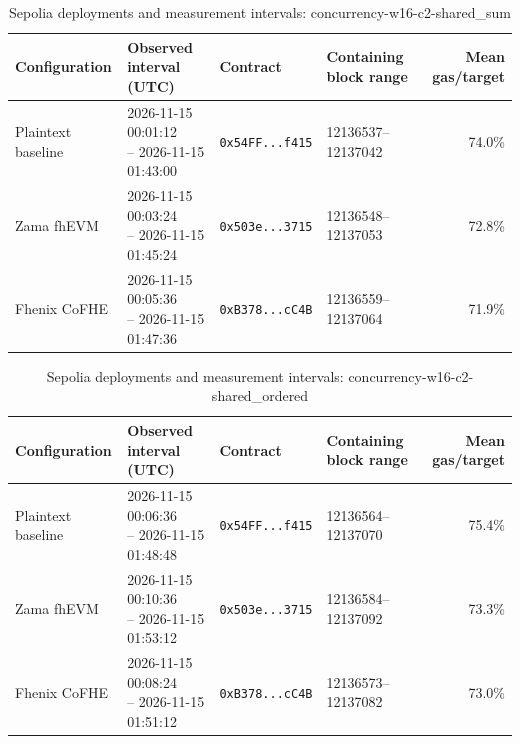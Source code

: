 \begin{table}[!t]
\caption{Sepolia deployments and measurement intervals: concurrency-w16-c2-shared\_sum}
\label{tab:sepolia-concurrency-w16-c2-shared-sum}
\centering
\footnotesize
\setlength{\tabcolsep}{4pt}
\begin{tabular}{|l|l|l|l|r|}
\hline
\textbf{Configuration} & \textbf{Observed interval (UTC)} & \textbf{Contract} & \textbf{Containing block range} & \textbf{Mean gas/target} \\
\hline
Plaintext baseline & \shortstack[l]{2026-11-15 00:01:12 \\ -- 2026-11-15 01:43:00} & \texttt{0x54FF...f415} & 12136537--12137042 & 74.0\% \\
\hline
Zama fhEVM & \shortstack[l]{2026-11-15 00:03:24 \\ -- 2026-11-15 01:45:24} & \texttt{0x503e...3715} & 12136548--12137053 & 72.8\% \\
\hline
Fhenix CoFHE & \shortstack[l]{2026-11-15 00:05:36 \\ -- 2026-11-15 01:47:36} & \texttt{0xB378...cC4B} & 12136559--12137064 & 71.9\% \\
\hline
\end{tabular}
\end{table}

\begin{table}[!t]
\caption{Sepolia deployments and measurement intervals: concurrency-w16-c2-shared\_ordered}
\label{tab:sepolia-concurrency-w16-c2-shared-ordered}
\centering
\footnotesize
\setlength{\tabcolsep}{4pt}
\begin{tabular}{|l|l|l|l|r|}
\hline
\textbf{Configuration} & \textbf{Observed interval (UTC)} & \textbf{Contract} & \textbf{Containing block range} & \textbf{Mean gas/target} \\
\hline
Plaintext baseline & \shortstack[l]{2026-11-15 00:06:36 \\ -- 2026-11-15 01:48:48} & \texttt{0x54FF...f415} & 12136564--12137070 & 75.4\% \\
\hline
Zama fhEVM & \shortstack[l]{2026-11-15 00:10:36 \\ -- 2026-11-15 01:53:12} & \texttt{0x503e...3715} & 12136584--12137092 & 73.3\% \\
\hline
Fhenix CoFHE & \shortstack[l]{2026-11-15 00:08:24 \\ -- 2026-11-15 01:51:12} & \texttt{0xB378...cC4B} & 12136573--12137082 & 73.0\% \\
\hline
\end{tabular}
\end{table}
